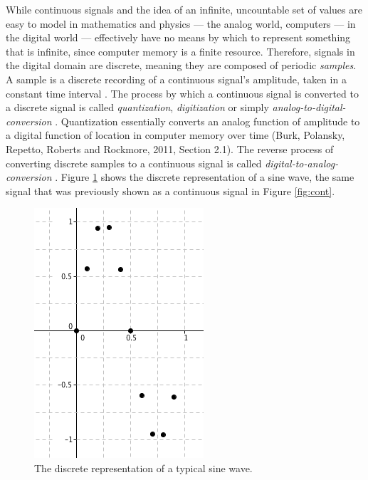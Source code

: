 \documentclass[12pt,twoside]{report}
\begin{document}
\noindent While continuous signals and the idea of an infinite, uncountable set of values are easy to model in mathematics and physics --- the analog world, computers --- in the digital world --- effectively have no means by which to represent something that is infinite, since computer memory is a finite resource. Therefore, signals in the digital domain are discrete, meaning they are composed of periodic \emph{samples}. A sample is a discrete recording of a continuous signal's amplitude, taken in a constant time interval . The process by which a continuous signal is converted to a discrete signal is called \emph{quantization}, \emph{digitization} or simply \emph{analog-to-digital-conversion}  . Quantization essentially converts an analog function of amplitude to a digital function of location in computer memory over time (Burk, Polansky, Repetto, Roberts and Rockmore, 2011, Section 2.1). The reverse process of converting discrete samples to a continuous signal is called \emph{digital-to-analog-conversion} . Figure \ref{fig:disc} shows the discrete representation of a sine wave, the same signal that was previously shown as a continuous signal in Figure \ref{fig:cont}.

\begin{figure}[h!]

  \centering

  \includegraphics[scale=0.5]{img/disc}

  \caption{The discrete representation of a typical sine wave.}

  \label{fig:disc}

\end{figure}
\end{document}
